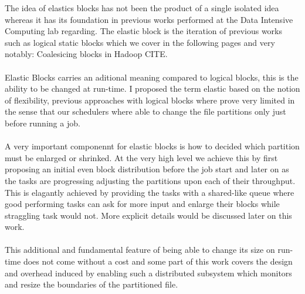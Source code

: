 The idea of elastics blocks has not been the product of a single isolated idea
whereas it has its foundation in previous works performed at the Data Intensive
Computing lab regarding. The elastic block is the iteration of previous works
such as logical static blocks which we cover in the following pages and very 
notably: Coalesicing blocks in Hadoop CITE. \\ \\ 

Elastic Blocks carries an aditional meaning compared to logical blocks, this is
the ability to be changed at run-time. I proposed the term elastic based on the
notion of flexibility, previous approaches with logical blocks where prove very
limited in the sense that our schedulers where able to change the file partitions 
only just before running a job. \\ \\ 

A very important componennt for elastic blocks is how to decided which partition must be
enlarged or shrinked. At the very high level we achieve this by first proposing
an initial even block distribution before the job start and later on as the
tasks are progressing adjusting the partitions upon each of their throughput.
This is elagantly achieved by providing the tasks with a shared-like queue where
good performing tasks can ask for more input and enlarge their blocks while
straggling task would not. More explicit details would be discussed later on
this work. \\ \\ 

This additional and fundamental feature of being able to change its size on
run-time does not come without a cost and some part of this work covers the
design and overhead induced by enabling such a distributed subsystem which monitors and
resize the boundaries of the partitioned file.

